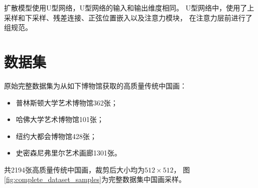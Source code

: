 扩散模型使用U型网络，U型网络的输入和输出维度相同。 
U型网络中，使用了上采样和下采样、残差连接、正弦位置嵌入以及注意力模块，
在注意力层前进行了组规范。

\section{数据集}
原始完整数据集{\cite{xue2020endtoend}}为从如下博物馆获取的高质量传统中国画：
\begin{itemize}
    \item 普林斯顿大学艺术博物馆362张；
    \item 哈佛大学艺术博物馆101张；
    \item 纽约大都会博物馆428张；
    \item 史密森尼弗里尔艺术画廊1301张。
\end{itemize}

共2194张高质量传统中国画，裁剪后大小均为{$512 \times 512$}，
图{\ref{fig:complete_dataset_samples}}为完整数据集中国画采样。

